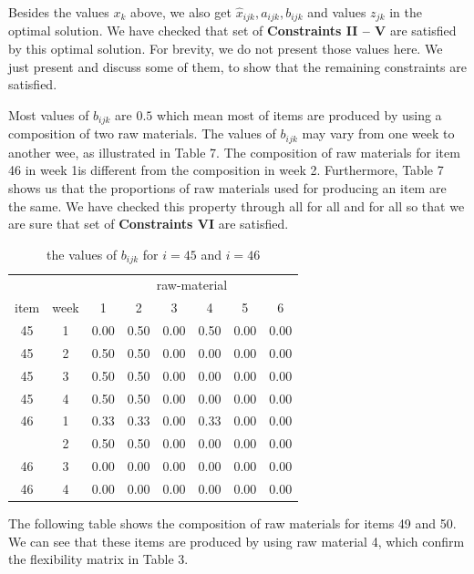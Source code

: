 \documentclass[preprint, 3p,
authoryear]{elsarticle} %
\begin{document}
Besides the values \(x_k\) above, we also get
\(\hat{x}_{ijk}, a_{ijk}, b_{ijk}\) and values \(z_{jk}\) in the optimal
solution. We have checked that set of \textbf{Constraints II -- V} are
satisfied by this optimal solution. For brevity, we do not present those
values here. We just present and discuss some of them, to show that the
remaining constraints are satisfied.

Most values of \(b_{ijk}\) are \(0.5\) which mean most of items are
produced by using a composition of two raw materials. The values of
\(b_{ijk}\) may vary from one week to another wee, as illustrated in
Table 7. The composition of raw materials for item 46 in week 1is
different from the composition in week 2. Furthermore, Table 7 shows us
that the proportions of raw materials used for producing an item are the
same. We have checked this property through all for all and for all so
that we are sure that set of \textbf{Constraints VI} are satisfied.

\begin{table}[!h]

\caption{\label{tab:unnamed-chunk-10}the values of $b_{ijk}$ for $i = 45$ and $i = 46$}
\centering
\begin{tabular}[t]{cccccccc}
\toprule
\multicolumn{2}{c}{ } & \multicolumn{6}{c}{raw-material} \\
\cmidrule(l{3pt}r{3pt}){3-8}
item & week & 1 & 2 & 3 & 4 & 5 & 6\\
\midrule
45 & 1 & 0.00 & 0.50 & 0.00 & 0.50 & 0.00 & 0.00\\
45 & 2 & 0.50 & 0.50 & 0.00 & 0.00 & 0.00 & 0.00\\
45 & 3 & 0.50 & 0.50 & 0.00 & 0.00 & 0.00 & 0.00\\
45 & 4 & 0.50 & 0.50 & 0.00 & 0.00 & 0.00 & 0.00\\
46 & 1 & 0.33 & 0.33 & 0.00 & 0.33 & 0.00 & 0.00\\
\addlinespace
46 & 2 & 0.50 & 0.50 & 0.00 & 0.00 & 0.00 & 0.00\\
46 & 3 & 0.00 & 0.00 & 0.00 & 0.00 & 0.00 & 0.00\\
46 & 4 & 0.00 & 0.00 & 0.00 & 0.00 & 0.00 & 0.00\\
\bottomrule
\end{tabular}
\end{table}

The following table shows the composition of raw materials for items 49
and 50. We can see that these items are produced by using raw material
4, which confirm the flexibility matrix in Table 3.
\end{document}
